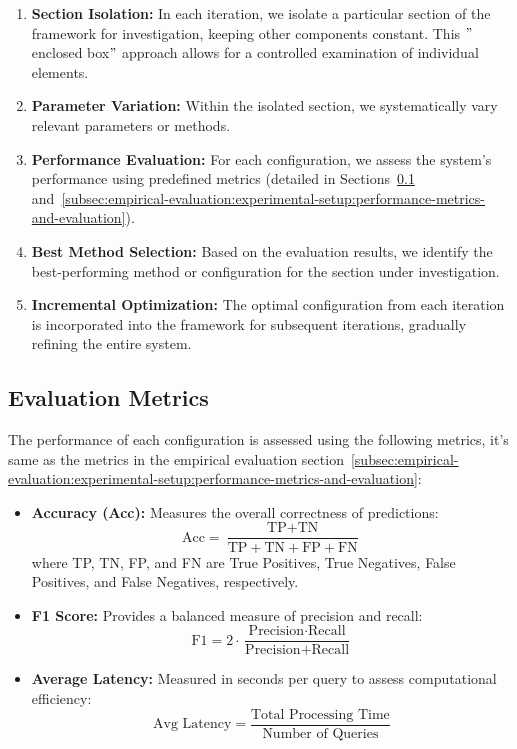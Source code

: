 \begin{enumerate}
    \item \textbf{Section Isolation:} In each iteration, we isolate a particular section of the framework for investigation, keeping other components constant.
    This \("\)enclosed box\("\) approach allows for a controlled examination of individual elements.
    \item \textbf{Parameter Variation:} Within the isolated section, we systematically vary relevant parameters or methods.
    \item \textbf{Performance Evaluation:} For each configuration, we assess the system's performance using predefined metrics (detailed in Sections~\ref{subsec:ablation-metrics} and~\ref{subsec:empirical-evaluation:experimental-setup:performance-metrics-and-evaluation}).
    \item \textbf{Best Method Selection:} Based on the evaluation results, we identify the best-performing method or configuration for the section under investigation.
    \item \textbf{Incremental Optimization:} The optimal configuration from each iteration is incorporated into the framework for subsequent iterations, gradually refining the entire system.
\end{enumerate}

\subsection{Evaluation Metrics}\label{subsec:ablation-metrics}
The performance of each configuration is assessed using the following metrics, it's same as the metrics in the empirical evaluation section~\ref{subsec:empirical-evaluation:experimental-setup:performance-metrics-and-evaluation}:

\begin{itemize}
    \item \textbf{Accuracy (Acc):} Measures the overall correctness of predictions:
    \begin{equation}
        \text{Acc} = \frac{\text{TP} + \text{TN}}{\text{TP} + \text{TN} + \text{FP} + \text{FN}}
    \end{equation}
    where TP, TN, FP, and FN are True Positives, True Negatives, False Positives, and False Negatives, respectively.
    \item \textbf{F1 Score:} Provides a balanced measure of precision and recall:
    \begin{equation}
        \text{F1} = 2 \cdot \frac{\text{Precision} \cdot \text{Recall}}{\text{Precision} + \text{Recall}}
    \end{equation}
    \item \textbf{Average Latency:} Measured in seconds per query to assess computational efficiency:
    \begin{equation}
        \text{Avg Latency} = \frac{\text{Total Processing Time}}{\text{Number of Queries}}
    \end{equation}
\end{itemize}

